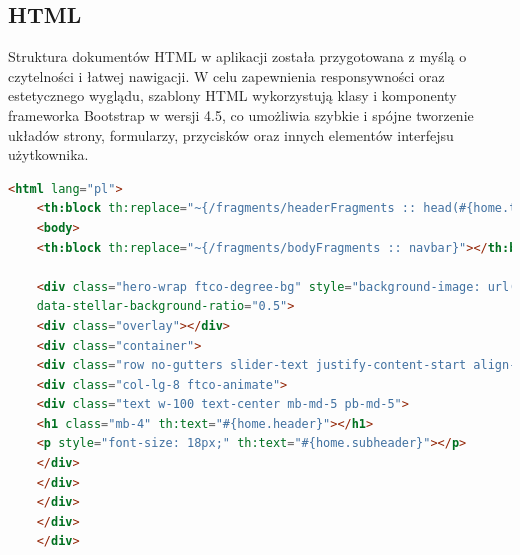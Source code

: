 \documentclass[12pt]{article}
\begin{document}
	\subsection{HTML}
	Struktura dokumentów HTML w aplikacji została przygotowana z myślą o czytelności i łatwej nawigacji. W celu zapewnienia responsywności oraz estetycznego wyglądu, szablony HTML wykorzystują klasy i komponenty frameworka Bootstrap w wersji 4.5, co umożliwia szybkie i spójne tworzenie układów strony, formularzy, przycisków oraz innych elementów interfejsu użytkownika.
	\begin{lstlisting}[language=HTML, caption={Kod HTML strony głównej}]
	<html lang="pl">
	<th:block th:replace="~{/fragments/headerFragments :: head(#{home.title})}"></th:block>
	<body>
	<th:block th:replace="~{/fragments/bodyFragments :: navbar}"></th:block>
	
	<div class="hero-wrap ftco-degree-bg" style="background-image: url('/images/bg_1.jpg');"
	data-stellar-background-ratio="0.5">
	<div class="overlay"></div>
	<div class="container">
	<div class="row no-gutters slider-text justify-content-start align-items-center justify-content-center">
	<div class="col-lg-8 ftco-animate">
	<div class="text w-100 text-center mb-md-5 pb-md-5">
	<h1 class="mb-4" th:text="#{home.header}"></h1>
	<p style="font-size: 18px;" th:text="#{home.subheader}"></p>
	</div>
	</div>
	</div>
	</div>
	</div>
	

\end{lstlisting}
\end{document}
